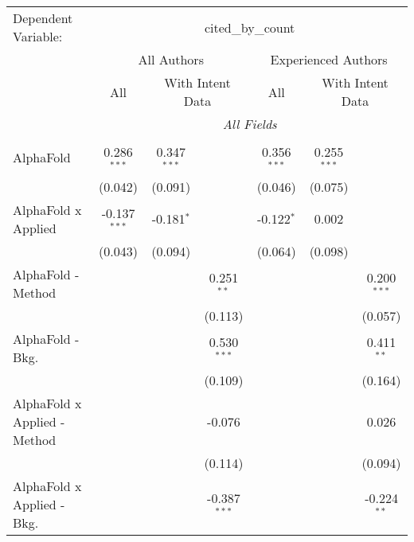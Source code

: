 \begingroup
\centering
\begin{tabular}{lcccccc}
   \tabularnewline \midrule \midrule
   Dependent Variable: & \multicolumn{6}{c}{cited\_by\_count}\\
 & \multicolumn{3}{c}{All Authors} & \multicolumn{3}{c}{Experienced Authors} \\
\cmidrule(lr){2-4} \cmidrule(lr){5-7}
 & \multicolumn{1}{c}{All} & \multicolumn{2}{c}{With Intent Data} & \multicolumn{1}{c}{All} & \multicolumn{2}{c}{With Intent Data} \\
\cmidrule(lr){2-2} \cmidrule(lr){3-4} \cmidrule(lr){5-5} \cmidrule(lr){6-7}
 & \multicolumn{6}{c}{\textit{All Fields}} \\ \\
   AlphaFold                      & 0.286$^{***}$  & 0.347$^{***}$ &                & 0.356$^{***}$  & 0.255$^{***}$ &   \\   
                                  & (0.042)        & (0.091)       &                & (0.046)        & (0.075)       &   \\   
   AlphaFold x Applied            & -0.137$^{***}$ & -0.181$^{*}$  &                & -0.122$^{*}$   & 0.002         &   \\   
                                  & (0.043)        & (0.094)       &                & (0.064)        & (0.098)       &   \\   
   AlphaFold - Method             &                &               & 0.251$^{**}$   &                &               & 0.200$^{***}$\\   
                                  &                &               & (0.113)        &                &               & (0.057)\\   
   AlphaFold - Bkg.               &                &               & 0.530$^{***}$  &                &               & 0.411$^{**}$\\   
                                  &                &               & (0.109)        &                &               & (0.164)\\   
   AlphaFold x Applied - Method   &                &               & -0.076         &                &               & 0.026\\   
                                  &                &               & (0.114)        &                &               & (0.094)\\   
   AlphaFold x Applied - Bkg.     &                &               & -0.387$^{***}$ &                &               & -0.224$^{**}$\\   

\end{tabular}
